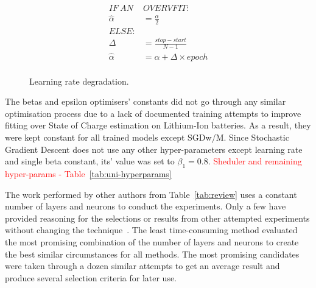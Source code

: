 \begin{equation}
  \begin{split}
      IF \ AN \ & OVERVFIT: \\
      \hat{\alpha} &= \frac{\alpha }{2} \\
      ELSE: & \\
      \Delta &= \frac{stop - start}{N-1} \\
      \hat{\alpha} &= \alpha + \Delta \times epoch \\
      \label{eq:scheduler}
  \end{split}
\end{equation}
\begin{figure}[ht]
    \centering
    
    \caption{Learning rate degradation.}
    \label{fig:l_rate_progress}
\end{figure}

%
The betas and epsilon optimisers' constants did not go through any similar optimisation process due to a lack of documented training attempts to improve fitting over State of Charge estimation on Lithium-Ion batteries.
As a result, they were kept constant for all trained models except SGDw/M.
Since Stochastic Gradient Descent does not use any other hyper-parameters except learning rate and single beta constant, its' value was set to $\beta_1 = 0.8$.
\textcolor{red}{Sheduler and remaining hyper-params - \mbox{Table~\ref{tab:uni-hyperparams}}}
\begin{table}[htbp]
  \renewcommand{\arraystretch}{1.3}
  \caption{Optimisers Hyper-Parameters}
  \centering
  \label{tab:uni-hyperparams}
\end{table}

%
The work performed by other authors from Table~\ref{tab:review} uses a constant number of layers and neurons to conduct the experiments.
Only a few have provided reasoning for the selections or results from other attempted experiments without changing the technique~\cite{jiao_gru-rnn_2020,mamo_long_2020}.
The least time-consuming method evaluated the most promising combination of the number of layers and neurons to create the best similar circumstances for all methods.
The most promising candidates were taken through a dozen similar attempts to get an average result and produce several selection criteria for later use.
